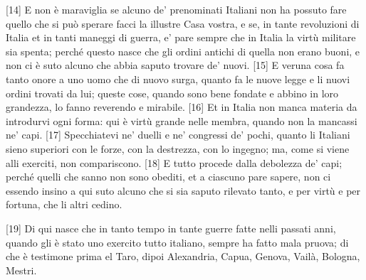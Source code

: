 \pagebreak

{[}14{]} E non è maraviglia se alcuno de' prenominati Italiani non ha
possuto fare quello che si può sperare facci la illustre Casa vostra, e
se, in tante revoluzioni di Italia et in tanti maneggi di guerra, e'
pare sempre che in Italia la virtù militare sia spenta; perché questo
nasce che gli ordini antichi di quella non erano buoni, e non ci è suto
alcuno che abbia saputo trovare de' nuovi. {[}15{]} E veruna cosa fa
tanto onore a uno uomo che di nuovo surga, quanto fa le nuove legge e li
nuovi ordini trovati da lui; queste cose, quando sono bene fondate e
abbino in loro grandezza, lo fanno reverendo e mirabile. {[}16{]} Et in
Italia non manca materia da introdurvi ogni forma: qui è virtù grande
nelle membra, quando non la mancassi ne' capi. {[}17{]} Specchiatevi ne'
duelli e ne' congressi de' pochi, quanto li Italiani sieno superiori con
le forze, con la destrezza, con lo ingegno; ma, come si viene alli
exerciti, non compariscono. {[}18{]} E tutto procede dalla debolezza de'
capi; perché quelli che sanno non sono obediti, et a ciascuno pare
sapere, non ci essendo insino a qui suto alcuno che si sia saputo
rilevato tanto, e per virtù e per fortuna, che li altri cedino.

{[}19{]} Di qui nasce che in tanto tempo in tante guerre fatte nelli passati  anni, quando gli è stato uno exercito tutto italiano, sempre ha fatto mala pruova; di che è testimone prima el Taro, dipoi Alexandria, Capua, Genova, Vailà, Bologna, Mestri.

